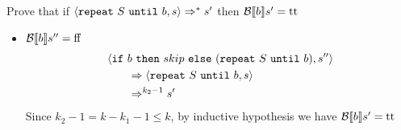 \begin{exercise}{
    Prove that if $\left<\texttt{repeat}\ S\ \texttt{until}\ b, s\right> \Rightarrow^* s'$ then $\mathcal{B} \llbracket b \rrbracket s' = \text{tt}$
}
\begin{itemize}
\begin{itemize}
                \item $\mathcal{B} \llbracket  b \rrbracket s'' = \text{ff}$
                    \begin{align*}
                        &\instr{\texttt{if}\ b\ \texttt{then}\ skip\ \texttt{else}\ (\texttt{repeat}\ S\ \texttt{until}\ b)}{s''}
                        \\&\qquad \Rightarrow \instr{\texttt{repeat}\ S\ \texttt{until}\ b}{s}
                        \\&\qquad \Rightarrow^{k_2 - 1} s'
                    \end{align*}
                    Since $k_2 - 1 = k - k_1 - 1 \leq k$, by inductive hypothesis we have $\mathcal{B} \llbracket  b \rrbracket s' = \text{tt}$
            \end{itemize}
    \end{itemize}
\end{exercise}
